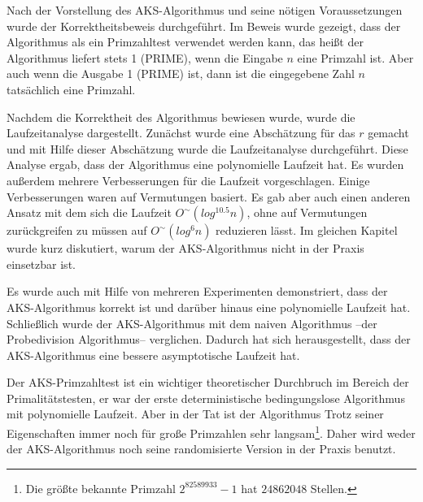 \documentclass[12pt,oneside]{article}
\theoremstyle{remark}
\theoremstyle{definition}
\begin{document}
Nach der Vorstellung des AKS-Algorithmus und seine nötigen Voraussetzungen wurde der Korrektheitsbeweis durchgeführt. Im Beweis wurde gezeigt, dass der Algorithmus als ein Primzahltest verwendet werden kann, das heißt der Algorithmus liefert stets 1 (PRIME), wenn die Eingabe $n$ eine Primzahl ist. Aber auch wenn die Ausgabe 1 (PRIME) ist, dann ist die eingegebene Zahl $n$ tatsächlich eine Primzahl.

Nachdem die Korrektheit des Algorithmus bewiesen wurde, wurde die Laufzeitanalyse dargestellt. Zunächst wurde eine Abschätzung für das $r$ gemacht und mit Hilfe dieser Abschätzung wurde die Laufzeitanalyse durchgeführt. Diese Analyse ergab, dass der Algorithmus eine polynomielle Laufzeit hat. Es wurden außerdem mehrere Verbesserungen für die Laufzeit vorgeschlagen. Einige Verbesserungen waren auf Vermutungen basiert. Es gab aber auch einen anderen Ansatz mit dem sich die Laufzeit $O^{\sim}(log^{10.5}n)$, ohne auf Vermutungen zurückgreifen zu müssen auf $O^{\sim}(log^6n)$ reduzieren lässt. Im gleichen Kapitel wurde kurz diskutiert, warum der AKS-Algorithmus nicht in der Praxis einsetzbar ist.

Es wurde auch mit Hilfe von mehreren Experimenten demonstriert, dass der AKS-Algorithmus korrekt ist und darüber hinaus eine polynomielle Laufzeit hat. Schließlich wurde der AKS-Algorithmus mit dem naiven Algorithmus --der Probedivision Algorithmus-- verglichen. Dadurch hat sich herausgestellt, dass der AKS-Algorithmus eine bessere asymptotische Laufzeit hat.

Der AKS-Primzahltest ist ein wichtiger theoretischer Durchbruch im Bereich der Primalitätstesten, er war der erste deterministische bedingungslose Algorithmus mit polynomielle Laufzeit. Aber in der Tat ist der Algorithmus Trotz seiner Eigenschaften immer noch für große Primzahlen sehr langsam\footnote{Die größte bekannte Primzahl $2^{82589933} - 1$ hat $24862048$ Stellen.}. Daher wird weder der AKS-Algorithmus noch seine randomisierte Version in der Praxis benutzt\cite{mit_aks}.



 


\clearpage
\lhead{}
\printbibliography
{}


\clearpage
\appendix
\end{document}
